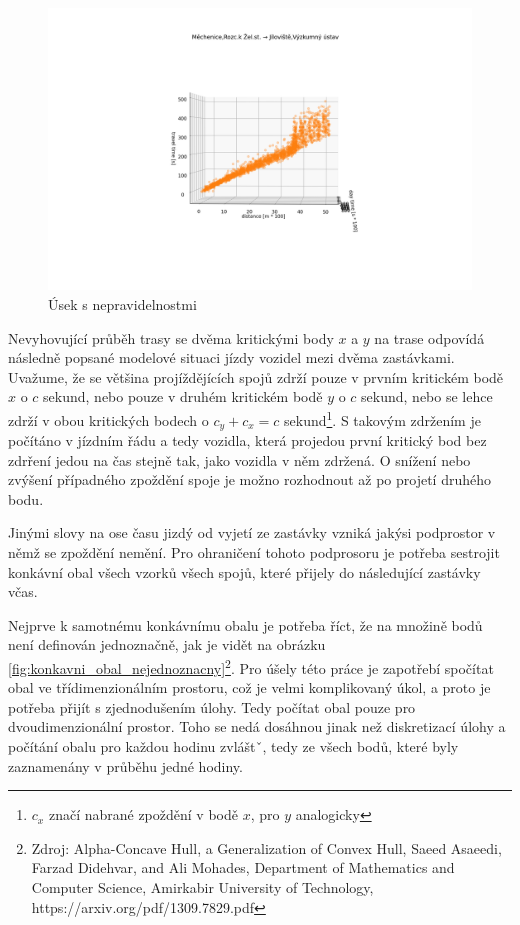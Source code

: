 \begin{figure}
	\centering
  \includegraphics[width=\linewidth]{../img/nepredvidatelne_zdrzeni.png}
  \caption{Úsek s nepravidelnostmi}
  \label{fig:nepredvidatelne_zdrzeni}
\end{figure}

Nevyhovující průběh trasy se dvěma kritickými body $x$ a $y$ na trase odpovídá následně popsané modelové situaci jízdy vozidel mezi dvěma zastávkami. Uvažume, že se většina projíždějících spojů zdrží pouze v prvním kritickém bodě $x$ o $c$ sekund, nebo pouze v druhém kritickém bodě $y$ o $c$ sekund, nebo se lehce zdrží v obou kritických bodech o $c_y + c_x = c$ sekund\footnote{$c_x$ značí nabrané zpoždění v bodě $x$, pro $y$ analogicky}. S takovým zdržením je počítáno v jízdním řádu a tedy vozidla, která projedou první kritický bod bez zdrření jedou na čas stejně tak, jako vozidla v něm zdržená. O snížení nebo zvýšení případného zpoždění spoje je možno rozhodnout až po projetí druhého bodu.

\bigbreak

Jinými slovy na ose času jizdý od vyjetí ze zastávky vzniká jakýsi podprostor v němž se zpoždění nemění. Pro ohraničení tohoto podprosoru je potřeba sestrojit konkávní obal všech vzorků všech spojů, které přijely do následující zastávky včas.

\bigbreak

Nejprve k samotnému konkávnímu obalu je potřeba říct, že na množině bodů není definován jednoznačně, jak je vidět na obrázku \ref{fig:konkavni_obal_nejednoznacny}\footnote{Zdroj: Alpha-Concave Hull, a Generalization of Convex Hull, Saeed Asaeedi, Farzad Didehvar, and Ali Mohades, Department of Mathematics and Computer Science, Amirkabir University of Technology, https://arxiv.org/pdf/1309.7829.pdf}. Pro úšely této práce je zapotřebí spočítat obal ve třídimenzionálním prostoru, což je velmi komplikovaný úkol, a proto je potřeba přijít s zjednodušením úlohy. Tedy počítat obal pouze pro dvoudimenzionální prostor. Toho se nedá dosáhnou jinak než diskretizací úlohy a počítání obalu pro každou hodinu zvláštˇ, tedy ze všech bodů, které byly zaznamenány v průběhu jedné hodiny.

